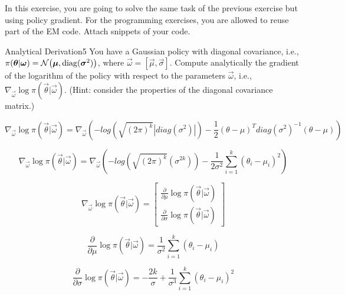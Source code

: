 In this exercise, you are going to solve the same task of the previous exercise but using policy gradient. 
For the programming exercises, you are allowed to reuse part of the EM code. 
Attach snippets of your code.

\begin{questions}


\begin{question}{Analytical Derivation}{5}
 	You have a Gaussian policy with diagonal covariance, i.e., $\pi({\boldsymbol{\theta}} | {\boldsymbol{\omega}}) = \mathcal{N}\big({\boldsymbol{\mu}}, \operatorname{\mathrm{diag}}({\boldsymbol{\sigma}}^2)\big)$, where $\vec \omega = [\vec \mu,\vec \sigma]$.
 	Compute analytically the gradient of the logarithm of the policy with respect to the parameters $\vec\omega$, i.e., $\nabla_{\vec\omega} \log \pi(\vec \theta | \vec \omega)$. (Hint: consider the properties of the diagonal covariance matrix.)
\begin{answer}
	 		
	 		\begin{equation}
	 		\nabla_{\vec\omega} \log \pi(\vec \theta | \vec \omega) = \nabla_{\vec\omega} (-log(\sqrt{(2\pi)^k} |diag(\sigma^2)|)-\frac{1}{2} (\theta-\mu)^T diag(\sigma^2)^{-1} (\theta-\mu) )
	 		\end{equation}
	 		
	\begin{equation}
	\nabla_{\vec\omega} \log \pi(\vec \theta | \vec \omega) = \nabla_{\vec\omega} (-log(\sqrt{(2\pi)^k} (\sigma^{2k}))-\frac{1}{2 \sigma^2} \sum_{i=1}^k (\theta_i - \mu_i)^2)
	\end{equation}
	
\begin{equation}
\nabla_{\vec\omega} \log \pi(\vec \theta | \vec \omega) = \begin{bmatrix}
\frac{\partial}{\partial \mu}\log \pi(\vec \theta | \vec \omega)\\\frac{\partial}{\partial \sigma}\log \pi(\vec \theta | \vec \omega)
\end{bmatrix}
\end{equation}

\begin{equation}
\frac{\partial}{\partial \mu}\log \pi(\vec \theta | \vec \omega)=\frac{1}{\sigma^2} \sum_{i=1}^{k}(\theta_i - \mu_i)
\end{equation}

\begin{equation}
\frac{\partial}{\partial \sigma}\log \pi(\vec \theta | \vec \omega)=-\frac{2k}{\sigma}+\frac{1}{\sigma^3} \sum_{i=1}^{k}(\theta_i - \mu_i)^2
\end{equation}


\end{answer}
\end{question}
\end{questions}
